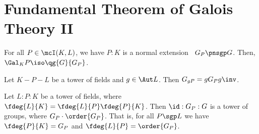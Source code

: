 \documentclass[a4paper]{article}
\begin{document}
\section{Fundamental Theorem of Galois Theory II}
\begin{ttheorem}
  For all \( P\in \mcI(K,L) \), we have \( P:K \) is a normal extension \iff~\( G_P\pnsgp G \).
  Then, \( \Gal_K P \iso \qg{G}{G_P} \).
\end{ttheorem}

\begin{tlemma}
  Let \( K-P-L \) be a tower of fields and \( g\in \Aut L \).
  Then \( G_{gP} = gG_Pg\inv \).
\end{tlemma}

\begin{tremark}
  Let \( L:P:K \) be a tower of fields, where \( \fdeg{L}{K} = \fdeg{L}{P}\fdeg{P}{K} \).
  Then \( \id:G_P:G \) is a tower of groups, where \( \index{G}{G_P}\cdot\order{G_P} \).
  That is, for all \( P\sgp L \) we have \( \fdeg{P}{K}=\index{G}{G_P} \) and \( \fdeg{L}{P} = \order{G_P} \).
\end{tremark}


\end{document}

